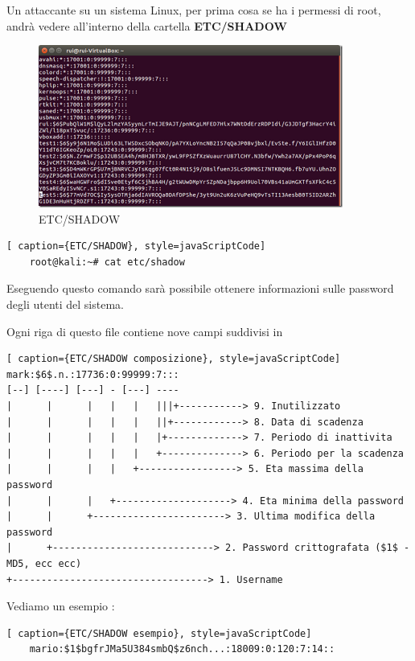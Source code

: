 Un attaccante su un sistema Linux\cite{hash_Linux}, per prima cosa se ha i permessi di root, andrà vedere all'interno della cartella \textbf{ETC/SHADOW}

\begin{figure}[h!]
    \centering
    \includegraphics[width=100mm]{Immagini/2/linux_1.png}
    \caption{ETC/SHADOW}
    \label{fig:ProcDump}
\end{figure}

\begin{lstlisting}[ caption={ETC/SHADOW}, style=javaScriptCode]
    root@kali:~# cat etc/shadow
\end{lstlisting}

Eseguendo questo comando sarà possibile ottenere informazioni sulle password degli utenti del sistema.

Ogni riga di questo file contiene nove campi suddivisi in 

\begin{lstlisting}[ caption={ETC/SHADOW composizione}, style=javaScriptCode]
mark:$6$.n.:17736:0:99999:7:::
[--] [----] [---] - [---] ----
|      |      |   |   |   |||+-----------> 9. Inutilizzato
|      |      |   |   |   ||+------------> 8. Data di scadenza
|      |      |   |   |   |+-------------> 7. Periodo di inattivita
|      |      |   |   |   +--------------> 6. Periodo per la scadenza
|      |      |   |   +-----------------> 5. Eta massima della password
|      |      |   +--------------------> 4. Eta minima della password
|      |      +-----------------------> 3. Ultima modifica della password
|      +----------------------------> 2. Password crittografata ($1$ -MD5, ecc ecc)
+----------------------------------> 1. Username
\end{lstlisting}

Vediamo un esempio :

\begin{lstlisting}[ caption={ETC/SHADOW esempio}, style=javaScriptCode]
    mario:$1$bgfrJMa5U384smbQ$z6nch...:18009:0:120:7:14::
\end{lstlisting}

